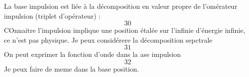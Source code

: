 La base impulsion est liée à la décomposition en valeur propre de l'omérateur impulsion (triplet d'opérateur) :
\begin{equation}
30
\end{equation}
COnnaitre l'impulsion implique une position étalée sur l'infinie d'énergie 
infinie, ce n'est pas physique. Je peux considérere la décomposition 
sepctrale
\begin{equation}
31
\end{equation}
On peut exprimer la fonction d'onde dans la ase impulsion
\begin{equation}
32
\end{equation}
Je peux faire de meme dans la base position.

























